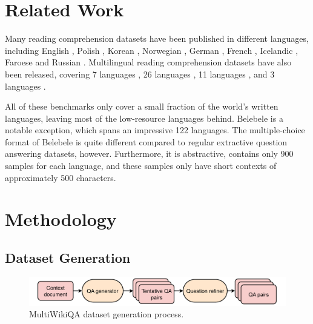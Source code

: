 \documentclass[10pt, a4paper]{article}
\begin{document}
\section{Related Work}
Many reading comprehension datasets have been published in different languages,
including English
,
Polish , Korean
, Norwegian
, German
, French
, Icelandic
, Faroese
 and Russian
. Multilingual reading comprehension datasets
have also been released, covering 7 languages
, 26 languages
, 11 languages
, and 3 languages
.

All of these benchmarks only cover a small fraction of the world's written languages,
leaving most of the low-resource languages behind. Belebele
 is a notable exception, which spans
an impressive 122 languages. The multiple-choice format of Belebele is quite different
compared to regular extractive question answering datasets, however. Furthermore, it is
abstractive, contains only 900 samples for each language, and these samples only have
short contexts of approximately 500 characters.


\section{Methodology}
\label{sec:methodology}


\subsection{Dataset Generation}
\label{sec:dataset-generation}

\begin{figure}[h]
    \centering
    \includegraphics[width=0.9\linewidth]{multi-wiki-qa-process.drawio.pdf}
    \caption{MultiWikiQA dataset generation process.}
    \label{fig:dataset-generation}
\end{figure}
\end{document}
